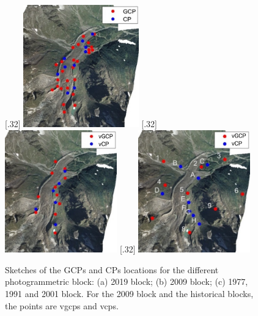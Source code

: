 \begin{figure}
    \centering
    \subcaptionbox{\label{fig:2:gcp:2019}}[.32\textwidth]{
        \includegraphics[height=5.3cm]{gcp_2019}
    } \hspace{1mm}
    \subcaptionbox{\label{fig:2:gcp:2009}}[.32\textwidth]{
        \includegraphics[height=5.3cm]{gcp_2009}
    }
    \subcaptionbox{\label{fig:2:gcp:historical}}[.32\textwidth]{
        \includegraphics[height=5.3cm]{gcp_historical}
    } 
    \caption{Sketches of the GCPs and CPs locations for the different photogrammetric block: (a) 2019 block; (b) 2009 block; (c) 1977, 1991 and 2001 block. For the 2009 block and the historical blocks, the points are \acsp{vgcp} and \acsp{vcp}.}
    \label{fig:2:gcp}
\end{figure}

